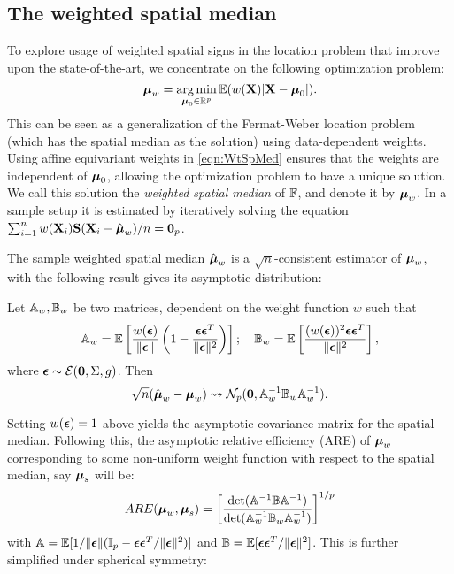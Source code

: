 \subsection{The weighted spatial median} 
To explore usage of weighted spatial signs in the location problem that improve upon the state-of-the-art, we concentrate on the following optimization problem:
%
\begin{equation}\label{eqn:WtSpMed}
{\boldsymbol{\mu}}_w = \operatorname*{arg\,min}_{{\boldsymbol{\mu}}_0 \in \mathbb{R}^p} {\mathbb{E}} ( w({\mathbf{X}}) | {\mathbf{X}} - {\boldsymbol{\mu}}_0 |).
\end{equation}
%
This can be seen as a generalization of the Fermat-Weber location problem (which has the spatial median \citep{brown83, Chaudhuri96} as the solution) using data-dependent weights. Using affine equivariant weights in \eqref{eqn:WtSpMed} ensures that the weights are independent of ${\boldsymbol{\mu}}_0$, allowing the optimization problem to have a unique solution. We call this solution the \textit{weighted spatial median} of ${\mathbb{F}}$, and denote it by ${\boldsymbol{\mu}}_w$. In a sample setup it is estimated by iteratively solving the equation $\sum_{i=1}^n w({\mathbf{X}}_i) {\mathbf{S}} ({\mathbf{X}}_i - \hat{{\boldsymbol{\mu}}}_w)/n = {\bf 0}_p$.

The sample weighted spatial median $\hat{{\boldsymbol{\mu}}}_w$ is a $\sqrt n$-consistent estimator of ${\boldsymbol{\mu}}_w$, with the following result gives its asymptotic distribution:
%
\begin{Theorem}
Let ${\mathbb{A}}_w, {\mathbb{B}}_w$ be two matrices, dependent on the weight function $w$ such that
%
$$
{\mathbb{A}}_w = {\mathbb{E}} \left[ \frac{w( {\boldsymbol{\epsilon}} ) }{\| {\boldsymbol{\epsilon}} \|} \left( 1 - \frac{{\boldsymbol{\epsilon}} {\boldsymbol{\epsilon}}^T}{\| {\boldsymbol{\epsilon}} \|^2} \right) \right];
\quad
{\mathbb{B}}_w = {\mathbb{E}} \left[ \frac{(w( {\boldsymbol{\epsilon}} ))^2 {\boldsymbol{\epsilon}} {\boldsymbol{\epsilon}}^T}{\| {\boldsymbol{\epsilon}} \|^2} \right],
$$
%
where ${\boldsymbol{\epsilon}} \sim \mathcal E({\bf 0}, \Sigma, g)$. Then
%
\begin{equation}
\sqrt n (\hat{{\boldsymbol{\mu}}}_w - {\boldsymbol{\mu}}_w) \leadsto \mathcal{N}_p ({\bf 0}, {\mathbb{A}}_w^{-1} {\mathbb{B}}_w {\mathbb{A}}_w^{-1}).
\end{equation}
\end{Theorem}
%

Setting $w({\boldsymbol{\epsilon}})=1$ above yields the asymptotic covariance matrix for the spatial median. Following this, the asymptotic relative efficiency (ARE) of ${\boldsymbol{\mu}}_w$ corresponding to some non-uniform weight function with respect to the spatial median, say ${\boldsymbol{\mu}}_s$ will be:
%
$$
ARE( {\boldsymbol{\mu}}_w, {\boldsymbol{\mu}}_s) = \left[ \frac{\text{det} ( {\mathbb{A}}^{-1} {\mathbb{B}} {\mathbb{A}}^{-1})}{\text{det} ( {\mathbb{A}}_w^{-1} {\mathbb{B}}_w {\mathbb{A}}_w^{-1})} \right]^{1/p}
$$
%
with ${\mathbb{A}} = {\mathbb{E}} [ 1/ \| {\boldsymbol{\epsilon}} \| ( {\mathbb{I}}_p - {\boldsymbol{\epsilon}} {\boldsymbol{\epsilon}}^T/ \| {\boldsymbol{\epsilon}} \|^2 ) ]$ and ${\mathbb{B}} = {\mathbb{E}} [ {\boldsymbol{\epsilon}} {\boldsymbol{\epsilon}}^T/ \| {\boldsymbol{\epsilon}} \|^2 ]$. This is further simplified under spherical symmetry:


